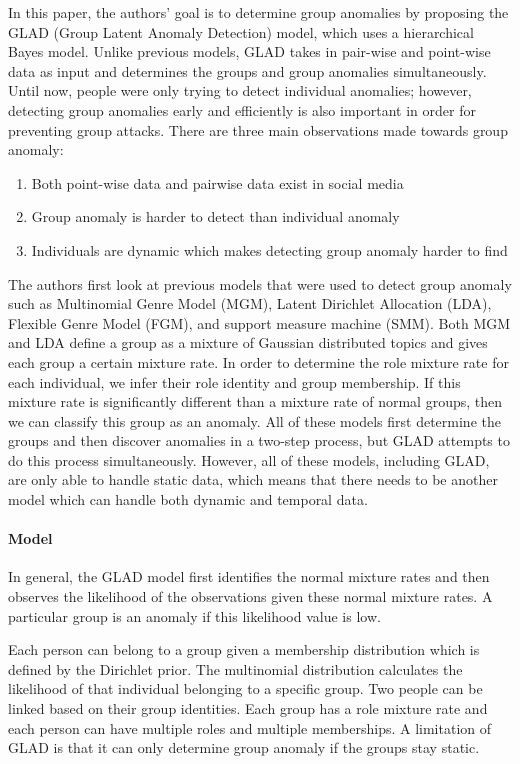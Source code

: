 \documentclass[11pt, oneside]{article}   	%
\begin{document}
\quad In this paper, the authors' goal is to determine group anomalies by proposing the GLAD \cite{glad} (Group Latent Anomaly Detection) model, which uses a hierarchical Bayes model.
Unlike previous models, GLAD takes in pair-wise and point-wise data as input and determines the groups and group anomalies simultaneously.
Until now, people were only trying to detect individual anomalies; however, detecting group anomalies early and efficiently is also important in order for preventing group attacks.
There are three main observations made towards group anomaly:
\begin{enumerate}
	\item Both point-wise data and pairwise data exist in social media
	\item Group anomaly is harder to detect than individual anomaly
	\item Individuals are dynamic which makes detecting group anomaly harder to find
\end{enumerate}

\quad The authors first look at previous models that were used to detect group anomaly such as Multinomial Genre Model (MGM), Latent Dirichlet Allocation (LDA), Flexible Genre Model (FGM), and support measure machine (SMM).
Both MGM and LDA define a group as a mixture of Gaussian distributed topics and gives each group a certain mixture rate.
In order to determine the role mixture rate for each individual, we infer their role identity and group membership.
If this mixture rate is significantly different than a mixture rate of normal groups, then we can classify this group as an anomaly.
All of these models first determine the groups and then discover anomalies in a two-step process, but GLAD attempts to do this process simultaneously.
However, all of these models, including GLAD, are only able to handle static data, which means that there needs to be another model which can handle both dynamic and temporal data.

\paragraph{Model}
\quad

\quad In general, the GLAD model first identifies the normal mixture rates and then observes the likelihood of the observations given these normal mixture rates.
A particular group is an anomaly if this likelihood value is low.

\quad Each person can belong to a group given a membership distribution which is defined by the Dirichlet prior.
The multinomial distribution calculates the likelihood of that individual belonging to a specific group.
Two people can be linked based on their group identities.
Each group has a role mixture rate and each person can have multiple roles and multiple memberships.
A limitation of GLAD is that it can only determine group anomaly if the groups stay static.
\end{document}
